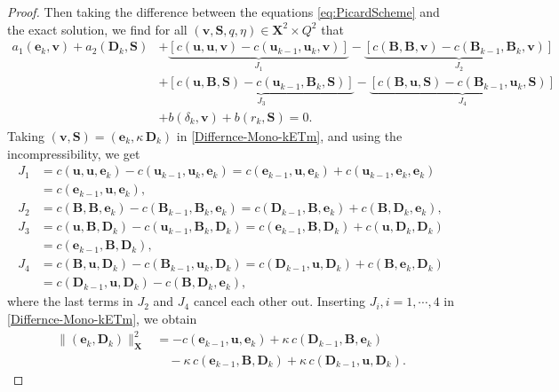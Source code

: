 \documentclass[3p]{elsarticle}
\def\V#1{\mathbf{#1}}
\def\VX{\mathbf{X}}
\begin{document}
\begin{proof}
Then taking the difference between the equations \eqref{eq:PicardScheme} and the exact solution, we find for all $ (\V{v},\V{S},q,\eta) \in \V{X}^2   \times  Q^2$ that
\begin{equation}\label{Differnce-Mono-kETm}
\begin{aligned}
 a_1 (\V{e}_{k},\V{v})
+ a_2(\V{D}_{k},\V{S})
& + \underbrace{[c(\V{u},\V{u},\V{v})  
-c(\V{u}_{k-1},\V{u}_{k},\V{v})]
 }_{J_1}
- \underbrace{[c(\V{B},\V{B},\V{v})  
-c(\V{B}_{k-1},\V{B}_{k},\V{v})]
}_{J_2}
\\ & %
+ 
\underbrace{[c(\V{u},\V{B},\V{S})  
-c(\V{u}_{k-1},\V{B}_{k},\V{S})]
}_{J_3} 
- 
\underbrace{[c(\V{B},\V{u},\V{S})  
-c(\V{B}_{k-1},\V{u}_{k},\V{S})]
}_{J_4} 
\\ & 
+ b(\delta_{k},\V{v})
+ b(r_{k},\V{S}) = 0. 
\end{aligned}
\end{equation}
Taking $(\V{v},\V{S}) = (\V{e}_k,\kappa\,\V{D}_k)$ in \eqref{Differnce-Mono-kETm}, and using the incompressibility, we get  
\begin{align*}
J_1 &= c(\V{u},\V{u},\V{e}_k)  
-c(\V{u}_{k-1},\V{u}_{k},\V{e}_k)
 = c(\V{e}_{k-1},\V{u},\V{e}_k) 
 + c(\V{u}_{k-1},\V{e}_k,\V{e}_k)
 \\ & =  
  c(\V{e}_{k-1},\V{u},\V{e}_k) ,
\\
J_2 &= 
c(\V{B},\V{B},\V{e}_k)  
-c(\V{B}_{k-1},\V{B}_{k},\V{e}_k)
 = c(\V{D}_{k-1},\V{B},\V{e}_k)  
 + c(\V{B}, \V{D}_k,\V{e}_k), 
 \\
J_3 &= 
c(\V{u},\V{B},\V{D}_k)  
-c(\V{u}_{k-1},\V{B}_{k},\V{D}_k)
 = c(\V{e}_{k-1},\V{B},\V{D}_k)
 + c(\V{u},\V{D}_{k},\V{D}_k)
\\ & = 
c(\V{e}_{k-1},\V{B},\V{D}_k),
 \\
J_4 &=
c(\V{B},\V{u},\V{D}_k)  
-c(\V{B}_{k-1},\V{u}_{k},\V{D}_k)
 = c(\V{D}_{k-1},\V{u},\V{D}_k)
+ c(\V{B},\V{e}_{k},\V{D}_k)
\\ & = 
c(\V{D}_{k-1},\V{u},\V{D}_k)
-c(\V{B},\V{D}_k,\V{e}_k),
\end{align*}
where the last terms in $J_2$ and $J_4$ cancel each other out. Inserting $J_i, i=1,\cdots, 4$ in \eqref{Differnce-Mono-kETm}, we obtain
\begin{equation*}
\begin{aligned}
\|(\V{e}_k,\V{D}_k)\|^2_\VX 
& = -c(\V{e}_{k-1},\V{u}, \V{e}_k)
+ \kappa\, c(\V{D}_{k-1},\V{B}, \V{e}_k)
\\ & 
\quad 
- \kappa\, c(\V{e}_{k-1},\V{B}, \V{D}_k)
+ \kappa\,c(\V{D}_{k-1},\V{u},\V{D}_k).

\end{aligned}
\end{equation*}
\end{proof}
\end{document}
